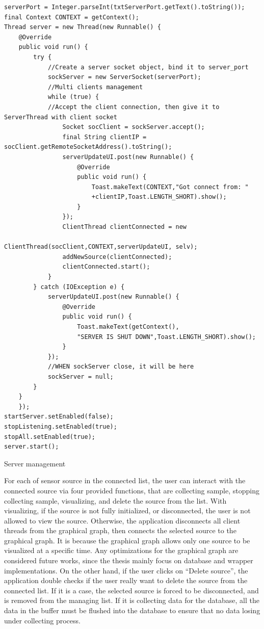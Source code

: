 \begin{code}[ht]
\begin{lstlisting}
serverPort = Integer.parseInt(txtServerPort.getText().toString());
final Context CONTEXT = getContext();
Thread server = new Thread(new Runnable() {
	@Override
	public void run() {
	    try {
	        //Create a server socket object, bind it to server_port
	        sockServer = new ServerSocket(serverPort);
	        //Multi clients management
	        while (true) {
	        //Accept the client connection, then give it to ServerThread with client socket
	            Socket socClient = sockServer.accept();
	            final String clientIP = socClient.getRemoteSocketAddress().toString();
	            serverUpdateUI.post(new Runnable() {
	                @Override
	                public void run() {
	                    Toast.makeText(CONTEXT,"Got connect from: "
	                    +clientIP,Toast.LENGTH_SHORT).show();
	                }
	            });
	            ClientThread clientConnected = new 
	                         ClientThread(socClient,CONTEXT,serverUpdateUI, selv);
	            addNewSource(clientConnected);
	            clientConnected.start();
	        }
	    } catch (IOException e) {
	        serverUpdateUI.post(new Runnable() {
	            @Override
	            public void run() {
	                Toast.makeText(getContext(),
	                "SERVER IS SHUT DOWN",Toast.LENGTH_SHORT).show();
	            }
	        });
	        //WHEN sockServer close, it will be here
	        sockServer = null;
	    }
	}
	});
startServer.setEnabled(false);
stopListening.setEnabled(true);
stopAll.setEnabled(true);
server.start();
\end{lstlisting}
\caption[Server management]{Server management}
\label{listing:ServerManagement}
\end{code}
For each of sensor source in the connected list, the user can interact with the connected source via four provided functions, that are collecting sample, stopping collecting sample, visualizing, and delete the source from the list. With visualizing, if the source is not fully initialized, or disconnected, the user is not allowed to view the source. Otherwise, the application disconnects all client threads from the graphical graph, then connects the selected source to the graphical graph. It is because the graphical graph allows only one source to be visualized at a specific time. Any optimizations for the graphical graph are considered future works, since the thesis mainly focus on database and wrapper implementations. On the other hand, if the user clicks on “Delete source”, the application double checks if the user really want to delete the source from the connected list. If it is a case, the selected source is forced to be disconnected, and is removed from the managing list. If it is collecting data for the database, all the data in the buffer must be flushed into the database to ensure that no data losing under collecting process.\\
